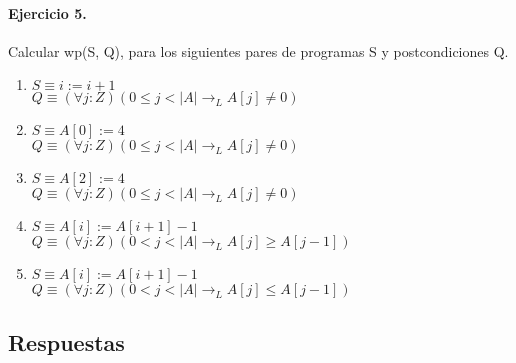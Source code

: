 \documentclass{article}
\begin{document}
\paragraph{Ejercicio 5.} Calcular wp(S, Q), para los siguientes pares de programas S y postcondiciones Q.

\begin{enumerate}[label=\alph*)]
\item $S \equiv i := i + 1$\\
  $Q \equiv (\forall j :Z)(0 \leq j < |A| \rightarrow_L A[j] \neq 0)$
\item $S \equiv A[0] := 4$\\
   $Q \equiv (\forall j :Z)(0 \leq j < |A| \rightarrow_L A[j] \neq 0)$
\item $S \equiv A[2] := 4$\\
   $Q \equiv (\forall j :Z)(0 \leq j < |A| \rightarrow_L A[j] \neq 0)$
\item $S \equiv A[i] := A[i+1] - 1$\\
   $Q \equiv (\forall j :Z)(0 < j < |A| \rightarrow_L A[j] \geq A[j - 1])$
\item $S \equiv A[i] := A[i+1] - 1$\\
   $Q \equiv (\forall j :Z)(0 < j < |A| \rightarrow_L A[j] \leq A[j - 1])$
\end{enumerate}

\subsection*{Respuestas}
\end{document}
